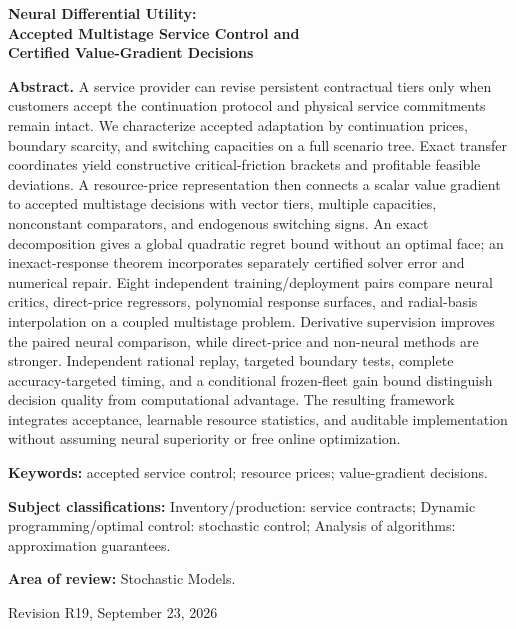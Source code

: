 \documentclass[11pt,letterpaper]{article}
\theoremstyle{definition}
\newcommand{\1}{\mathbf 1}
\begin{document}
\begin{titlepage}\centering
{\Large\bfseries Neural Differential Utility:\\ Accepted Multistage Service Control and\\ Certified Value-Gradient Decisions\par}
\vspace{.3in}{Anonymous manuscript for Operations Research\par}\vspace{.25in}
\begin{minipage}{\textwidth}
\textbf{Abstract.}
A service provider can revise persistent contractual tiers only when customers accept the continuation protocol and physical service commitments remain intact. We characterize accepted adaptation by continuation prices, boundary scarcity, and switching capacities on a full scenario tree. Exact transfer coordinates yield constructive critical-friction brackets and profitable feasible deviations. A resource-price representation then connects a scalar value gradient to accepted multistage decisions with vector tiers, multiple capacities, nonconstant comparators, and endogenous switching signs. An exact decomposition gives a global quadratic regret bound without an optimal face; an inexact-response theorem incorporates separately certified solver error and numerical repair. Eight independent training/deployment pairs compare neural critics, direct-price regressors, polynomial response surfaces, and radial-basis interpolation on a coupled multistage problem. Derivative supervision improves the paired neural comparison, while direct-price and non-neural methods are stronger. Independent rational replay, targeted boundary tests, complete accuracy-targeted timing, and a conditional frozen-fleet gain bound distinguish decision quality from computational advantage. The resulting framework integrates acceptance, learnable resource statistics, and auditable implementation without assuming neural superiority or free online optimization.
\par\vspace{.16in}\textbf{Keywords:} accepted service control; resource prices; value-gradient decisions.
\par\vspace{.10in}\textbf{Subject classifications:} Inventory/production: service contracts; Dynamic programming/optimal control: stochastic control; Analysis of algorithms: approximation guarantees.
\par\vspace{.10in}\textbf{Area of review:} Stochastic Models.
\end{minipage}\vfill{Revision R19, September 23, 2026\par}\end{titlepage}
\end{document}
